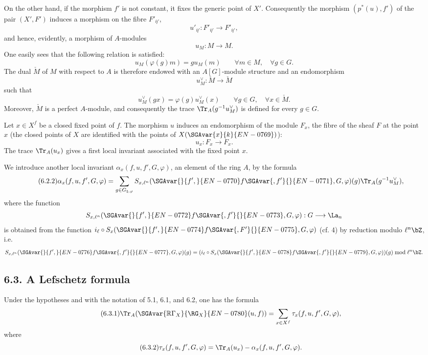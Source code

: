On the other hand, if the morphism $f'$ is not constant, it fixes the generic point of $X'$. Consequently the morphism $(p^*(u),f')$ of the pair $(X',F')$ induces a morphism on the fibre $F'_{\bar\eta'}$,
\[
u'_{\bar\eta'}:F'_{\bar\eta'}\longrightarrow F'_{\bar\eta'},
\]
and hence, evidently, a morphism of $A$-modules
\[
u_M:M\longrightarrow M.
\]
One easily sees that the following relation is satisfied:
\begin{equation}\tag{6.2.1}
u_M(\varphi(g)m)=g u_M(m) \qquad \forall m\in M,\quad \forall g\in G.
\end{equation}
The dual $\check{M}$ of $M$ with respect to $A$ is therefore endowed with an $A[G]$-module structure and an endomorphism
\[
u_M^\vee:\check{M}\longrightarrow \check{M}
\]
such that
\[
u_M^\vee(gx)=\varphi(g)u_M^\vee(x) \qquad \forall g\in G,\quad \forall x\in \check{M}.
\]
Moreover, $\check{M}$ is a perfect $A$-module, and consequently the trace $\Tr_A(g^{-1}u_M^\vee)$ is defined for every $g\in G$.

Let $x\in X^f$ be a closed fixed point of $f$. The morphism $u$ induces an endomorphism of the module $F_x$, the fibre of the sheaf $F$ at the point $x$ (the closed points of $X$ are identified with the points of $X(\SGAvar{x}{k}{EN-0769})$):
\[
u_x:F_x\longrightarrow F_x.
\]
The trace $\Tr_A(u_x)$ gives a first local invariant associated with the fixed point $x$.

We introduce another local invariant $\alpha_x(f,u,f',G,\varphi)$, an element of the ring $A$, by the formula
\begin{equation}\tag{6.2.2}
\alpha_x(f,u,f',G,\varphi)=
\sum_{g\in G_{\natural,\varphi}}
S_{x,\ell^n}(\SGAvar{}{f',}{EN-0770}f\SGAvar{,f'}{}{EN-0771},G,\varphi)(g)\Tr_A(g^{-1}u_M^\vee),
\end{equation}
where the function
\[
S_{x,\ell^n}(\SGAvar{}{f',}{EN-0772}f\SGAvar{,f'}{}{EN-0773},G,\varphi):G\longrightarrow\La_n
\]
is obtained from the function $i_\ell\circ S_x(\SGAvar{}{f',}{EN-0774}f\SGAvar{,F'}{}{EN-0775},G,\varphi)$ (cf. 4) by reduction modulo $\ell^n\bZ$, i.e.
\[
S_{x,\ell^n}(\SGAvar{}{f',}{EN-0776}f\SGAvar{,f'}{}{EN-0777},G,\varphi)(g)=
(i_\ell\circ S_x(\SGAvar{}{f',}{EN-0778}f\SGAvar{,f'}{}{EN-0779},G,\varphi))(g)\bmod \ell^n\bZ.
\]

\subsection*{6.3. A Lefschetz formula}
Under the hypotheses and with the notation of 5.1, 6.1, and 6.2, one has the formula
\begin{equation}
\tag{6.3.1}
\Tr_A(\SGAvar{\mathbb{R}\Gamma_X}{\RG_X}{EN-0780}(u,f))=\sum_{x\in X^f}\tau_x(f,u,f',G,\varphi),
\end{equation}
where
\begin{equation}
\tag{6.3.2}
\tau_x(f,u,f',G,\varphi)=\Tr_A(u_x)-\alpha_x(f,u,f',G,\varphi).
\end{equation}

